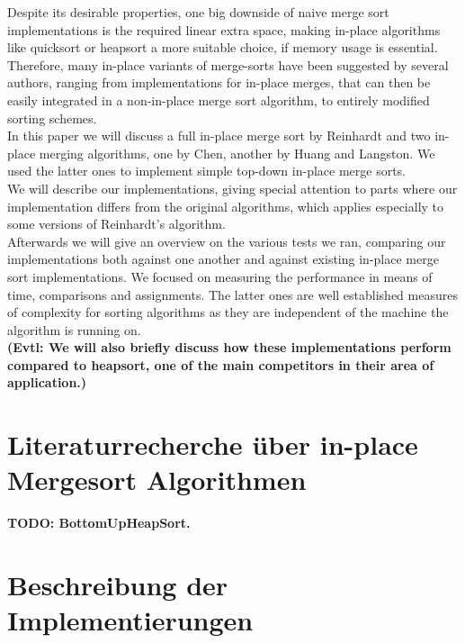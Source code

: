 \documentclass[11pt,pdftex,a4paper, twocolumn]{article}
\begin{document}
Despite its desirable properties, one big downside of naive merge sort implementations is the required linear extra space, making in-place algorithms like quicksort or heapsort a more suitable choice, if memory usage is essential. \\
Therefore, many in-place variants of merge-sorts have been suggested by several authors, ranging from implementations for in-place merges, that can then be easily integrated in a non-in-place merge sort algorithm, to entirely modified sorting schemes. \\
In this paper we will discuss a full in-place merge sort by Reinhardt\cite{Reinhardt92} and two in-place merging algorithms, one by Chen\cite{Chen06}, another by Huang and Langston\cite{huang1988practical}. We used the latter ones to implement simple top-down in-place merge sorts. \\
We will describe our implementations, giving special attention to parts where our implementation differs from the original algorithms, which applies especially to some versions of Reinhardt’s algorithm. \\
Afterwards we will give an overview on the various tests we ran, comparing our implementations both against one another and against existing in-place merge sort implementations. We focused on measuring the performance in means of time, comparisons and assignments. The latter ones are well established measures of complexity for sorting algorithms as they are independent of the machine the algorithm is running on. \\
\textbf{(Evtl: We will also briefly discuss how these implementations perform compared to heapsort, one of the main competitors in their area of application.)}
\section*{Literaturrecherche \"uber in-place Mergesort Algorithmen}
\textbf{TODO: BottomUpHeapSort\cite{wegener1993bottom}.}

\section*{Beschreibung der Implementierungen}
\end{document}
